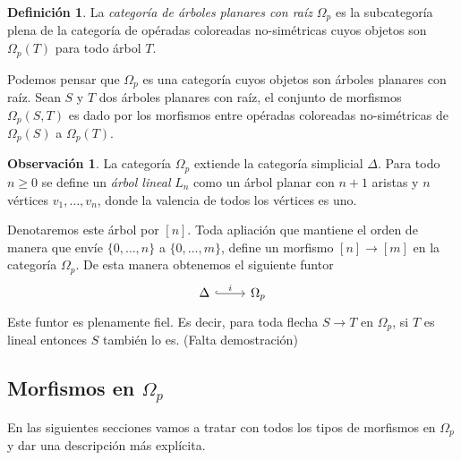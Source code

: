 \documentclass[11pt,a4paper,openright,oneside]{article}
\numberwithin{equation}{section}
\theoremstyle{definition}
\newtheorem{defi}[teo]{Definici\'on}
\newtheorem{obs}[teo]{Observaci\'on}
\begin{document}
\begin{defi}
    La \emph{categor\'ia de \'arboles planares con ra\'iz} $\Omega_p$ es la subcategor\'ia plena de la categor\'ia de op\'eradas coloreadas no-sim\'etricas cuyos objetos son $\Omega_p(T)$ para todo \'arbol $T$.

    Podemos pensar que $\Omega_p$ es una categor\'ia cuyos objetos son \'arboles planares con ra\'iz.
    Sean $S$ y $T$ dos \'arboles planares con ra\'iz, el conjunto de morfismos $\Omega_p(S, T)$ es dado por los morfismos entre op\'eradas coloreadas no-sim\'etricas de $\Omega_p(S)$ a $\Omega_p(T)$.
\end{defi}
\begin{obs}
    La categor\'ia $\Omega_p$ extiende la categor\'ia simplicial $\Delta$. Para todo $n\ge 0$ se define un \emph{\'arbol lineal} $L_n$ como un \'arbol planar con $n+1$ aristas y $n$ v\'ertices $v_1,\dots,v_n$, donde la valencia de todos los v\'ertices es uno.

    Denotaremos este \'arbol por $[n]$. Toda apliaci\'on que mantiene el orden de manera que env\'ie $\{0,\dots,n\}$ a $\{0,\dots,m\}$, define un morfismo $[n] \to [m]$ en la categor\'ia $\Omega_p$. De esta manera obtenemos el siguiente funtor
    \[
        \begin{tikzcd}
            \Delta \arrow[hook]{r}{i} & \Omega_p
        \end{tikzcd}
    \]
    Este funtor es plenamente fiel. Es decir, para toda flecha $S \to T$ en $\Omega_p$, si $T$ es lineal entonces $S$ tambi\'en lo es. (Falta demostraci\'on)
\end{obs}

\subsection{Morfismos en $\Omega_p$}
En las siguientes secciones vamos a tratar con todos los tipos de morfismos en $\Omega_p$ y dar una descripci\'on m\'as expl\'icita.
\end{document}

